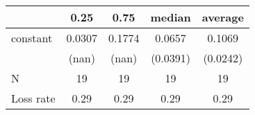 \begin{tabular}{lcccc}
\hline
          &  0.25  &  0.75  &  median  & average   \\
\midrule
\midrule
constant  & 0.0307 & 0.1774 & 0.0657   & 0.1069    \\
          & (nan)  & (nan)  & (0.0391) & (0.0242)  \\
N         & 19     & 19     & 19       & 19        \\
Loss rate & 0.29   & 0.29   & 0.29     & 0.29      \\
\hline
\end{tabular}